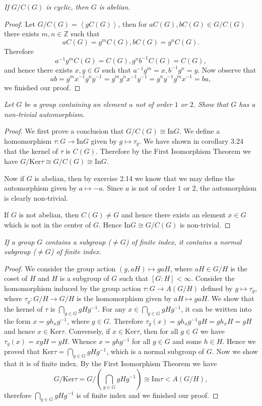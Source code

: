 \begin{problem}\em
If $G/C(G)$ is cyclic, then $G$ is abelian.
\end{problem}
\begin{proof}
Let $G/C\left( G \right) =\left< gC\left( G \right) \right> $, then for $aC\left( G \right) ,bC\left( G \right) \in G/C\left( G \right) $ there exists $m,n\in\mathbb{Z}$ such that
$$aC\left( G \right) =g^mC\left( G \right) ,bC\left( G \right) =g^nC\left( G \right). $$
Therefore 
$$a^{-1}g^mC\left( G \right) =C\left( G \right) ,g^nb^{-1}C\left( G \right) =C\left( G \right) ,$$
and hence there exists $x,y\in G$ such that $a^{-1}g^m=x,b^{-1}g^n=y$. Now observe that 
$$
ab=g^mx^{-1}g^ny^{-1}=g^mg^nx^{-1}y^{-1}=g^ny^{-1}g^mx^{-1}=ba,
$$
we finished our proof.
\end{proof}
\begin{problem}\em
Let $G$ be a group containing an element $a$ not of order $1$ or $2$. Show that $G$ has a non-trivial automorphism.
\end{problem}
\begin{proof}
We first prove a conclusion that $G/C(G)\cong\mathrm{In}G$. We define a homomorphism $\tau:G\to\mathrm{In}G$ given by $g\mapsto\tau_g$. We have shown in corollary 3.24 that the kernel of $\tau$ is $C(G)$. Therefore by the First Isomorphism Theorem we have $G/\mathrm{Ker}\tau\cong G/C(G)\cong\mathrm{In}G$.\par
Now if $G$ is abelian, then by exercise 2.14 we know that we may define the automorphism given by $a\mapsto-a$. Since $a$ is not of order $1$ or $2$, the automorphism is clearly non-trivial.\par
If $G$ is not abelian, then $C(G)\ne G$ and hence there exists an element $x\in G$ which is not in the center of $G$. Hence $\mathrm{In}G\cong G/C(G)$ is non-trivial.
\end{proof}
\begin{problem}\em
If a group $G$ contains a subgroup ($\ne G$) of finite index, it contains a normal subgroup ($\ne G$) of finite index.
\end{problem}
\begin{proof}
We consider the group action $(g,aH)\mapsto gaH$, where $aH\in G/H$ is the coset of $H$ and $H$ is a subgroup of $G$ such that $[G:H]<\infty$. Consider the homomorphism induced by the group action $\tau:G\to A(G/H)$ defined by $g\mapsto\tau_g$, where $\tau_g:G/H\to G/H$ is the homomorphism given by $aH\mapsto gaH$. We show that the kernel of $\tau$ is $\bigcap_{g\in G}gHg^{-1}$. For any $x\in\bigcap_{g\in G}gHg^{-1}$, it can be written into the form $x=gh_xg^{-1}$, where $g\in G$. Therefore $\tau_g(x)=gh_xg^{-1}gH=gh_xH=gH$ and hence $x\in\mathrm{Ker}\tau$. Conversely, if $x\in\mathrm{Ker}\tau$, then for all $g\in G$ we have $\tau_g(x)=xgH=gH$. Whence $x=ghg^{-1}$ for all $g\in G$ and some $h\in H$. Hence we proved that $\mathrm{Ker}\tau=\bigcap_{g\in G}gHg^{-1}$, which is a normal subgroup of $G$. Now we show that it is of finite index. By the First Isomorphism Theorem we have 
$$
G/\mathrm{Ker}\tau =G/\left( \bigcap_{g\in G}{gHg^{-1}} \right) \cong \mathrm{Im}\tau <A\left( G/H \right) ,
$$
therefore $\bigcap_{g\in G}{gHg^{-1}}$ is of finite index and we finished our proof.
\end{proof}

